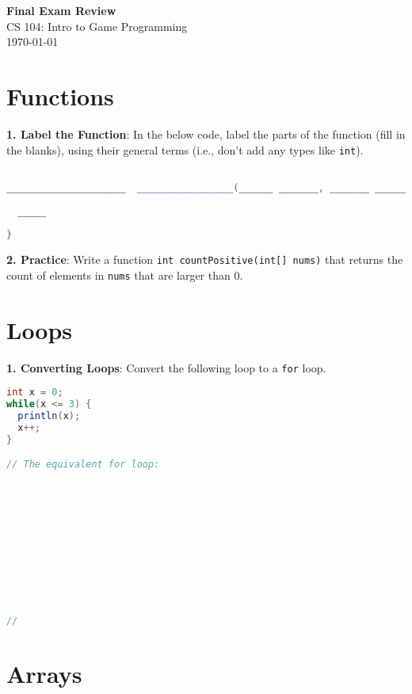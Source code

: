 \documentclass[11pt]{article}
\begin{document}
\begin{center}
  {\LARGE \textbf{Final Exam Review}}\\[1ex]
  {\large CS 104: Intro to Game Programming}\\
  \today
\end{center}

\vspace{1em}

\section{Functions}

\textbf{1. Label the Function}: In the below code, label the parts of the function (fill in the blanks), using their general terms (i.e., don't add any types like \texttt{int}).
\vspace{1em}
\begin{lstlisting}[language=Java]

_____________________  _________________(______ _______, _______ ________) {
  
  _____
  
}

\end{lstlisting}

\noindent\textbf{2. Practice}: Write a function \texttt{int countPositive(int[] nums)} that returns the count of elements in \texttt{nums} that are larger than 0.

\vspace{15em}

\pagebreak

\section{Loops}
\textbf{1. Converting Loops}: Convert the following loop to a \texttt{for} loop.

\begin{lstlisting}[language=Java]
int x = 0;
while(x <= 3) {
  println(x);
  x++;
}

// The equivalent for loop:











//
\end{lstlisting}

\vspace{1em}

\section{Arrays}
\end{document}
